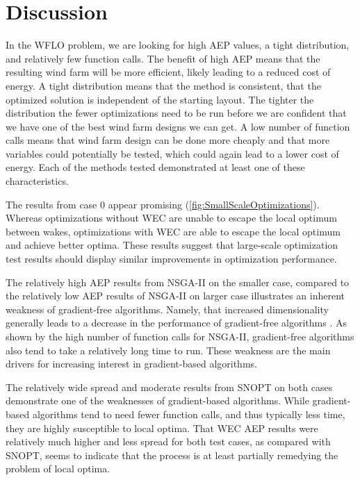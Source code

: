\documentclass[a4paper]{jpconf}
\begin{document}
\section{Discussion}
In the WFLO problem, we are looking for high AEP values, a tight distribution, and relatively few function calls. The benefit of high AEP means that the resulting wind farm will be more efficient, likely leading to a reduced cost of energy. A tight distribution means that the method is consistent, that the optimized solution is independent of the starting layout. The tighter the distribution the fewer optimizations need to be run before we are confident that we have one of the best wind farm designs we can get. A low number of function calls means that wind farm design can be done more cheaply and that more variables could potentially be tested, which could again lead to a lower cost of energy. Each of the methods tested demonstrated at least one of these characteristics.

The results from case 0 appear promising (\cref{fig:SmallScaleOptimizations}). Whereas optimizations without WEC are unable to escape the local optimum between wakes, optimizations with WEC are able to escape the local optimum and achieve better optima. These  results suggest that large-scale optimization test results should display similar improvements in optimization performance.

The relatively high AEP results from NSGA-II on the smaller case, compared to the relatively low AEP results of NSGA-II on larger case illustrates an inherent weakness of gradient-free algorithms. Namely, that increased dimensionality generally leads to a decrease in the performance of gradient-free algorithms \cite{rios2013-grad-free-comparison}. As shown by the high number of function calls for NSGA-II, gradient-free algorithms also tend to take a relatively long time to run. These weakness are the main drivers for increasing interest in gradient-based algorithms.

The relatively wide spread and moderate results from SNOPT on both cases demonstrate one of the weaknesses of gradient-based algorithms. While gradient-based algorithms tend to need fewer function calls, and thus typically less time, they are highly susceptible to local optima. That WEC AEP results were relatively much higher and less spread for both test cases, as compared with SNOPT, seems to indicate that the process is at least partially remedying the problem of local optima.
\end{document}
